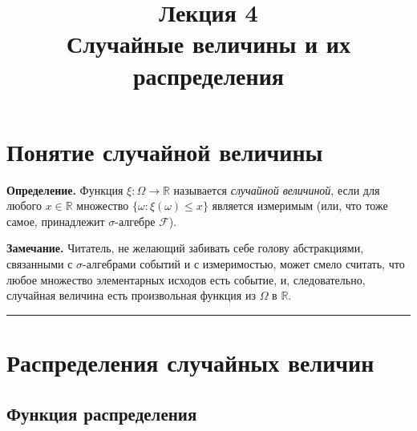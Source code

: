 \documentclass[11pt,a4paper]{article}
\title{
      {\Large Лекция 4} \\
      Случайные величины и их распределения
    }
\date{}
\begin{document}
    
  \maketitle
  \thispagestyle{empty}
  \tableofcontents
  \newpage



    \hypertarget{ux43fux43eux43dux44fux442ux438ux435-ux441ux43bux443ux447ux430ux439ux43dux43eux439-ux432ux435ux43bux438ux447ux438ux43dux44b}{%
\section{Понятие случайной
величины}\label{ux43fux43eux43dux44fux442ux438ux435-ux441ux43bux443ux447ux430ux439ux43dux43eux439-ux432ux435ux43bux438ux447ux438ux43dux44b}}

\textbf{Определение.} Функция \(\xi: \Omega \rightarrow \mathbb{R}\)
называется \emph{случайной величиной}, если для любого
\(x \in \mathbb{R}\) множество \(\{\omega : \xi(\omega) \le x\}\)
является измеримым (или, что тоже самое, принадлежит \(\sigma\)-алгебре
\(\mathcal{F}\)).

\textbf{Замечание.} Читатель, не желающий забивать себе голову
абстракциями, связанными с \(\sigma\)-алгебрами событий и с
измеримостью, может смело считать, что любое множество элементарных
исходов есть событие, и, следовательно, случайная величина есть
произвольная функция из \(\Omega\) в \(\mathbb{R}\).

    \begin{center}\rule{0.5\linewidth}{0.5pt}\end{center}

    \hypertarget{ux440ux430ux441ux43fux440ux435ux434ux435ux43bux435ux43dux438ux44f-ux441ux43bux443ux447ux430ux439ux43dux44bux445-ux432ux435ux43bux438ux447ux438ux43d}{%
\section{Распределения случайных
величин}\label{ux440ux430ux441ux43fux440ux435ux434ux435ux43bux435ux43dux438ux44f-ux441ux43bux443ux447ux430ux439ux43dux44bux445-ux432ux435ux43bux438ux447ux438ux43d}}

\hypertarget{ux444ux443ux43dux43aux446ux438ux44f-ux440ux430ux441ux43fux440ux435ux434ux435ux43bux435ux43dux438ux44f}{%
\subsection{Функция
распределения}\label{ux444ux443ux43dux43aux446ux438ux44f-ux440ux430ux441ux43fux440ux435ux434ux435ux43bux435ux43dux438ux44f}}
\end{document}
